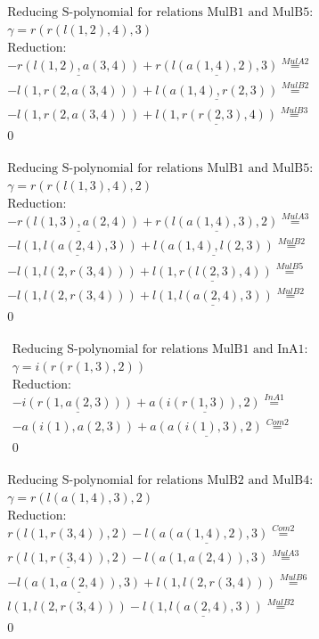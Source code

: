 \documentclass[11pt]{amsart}
\begin{document}
\begin{align*} 
& \text{Reducing S-polynomial for relations MulB1 and MulB5:} \\ 
& \gamma = r(r(l(1,2),4),3) \\ 
& \text{Reduction}: \\& - \underline{r(l(1,2),a(3,4))} + \underline{r(l(a(1,4),2),3)} \stackrel{ MulA2 }{=}  \\ 
& - l(1,r(2,a(3,4))) + \underline{l(a(1,4),r(2,3))} \stackrel{ MulB2 }{=}  \\ 
& - l(1,r(2,a(3,4))) + \underline{l(1,r(r(2,3),4))} \stackrel{ MulB3 }{=}  \\ 
&0\\ 
\end{align*} 
 
\begin{align*} 
& \text{Reducing S-polynomial for relations MulB1 and MulB5:} \\ 
& \gamma = r(r(l(1,3),4),2) \\ 
& \text{Reduction}: \\& - \underline{r(l(1,3),a(2,4))} + \underline{r(l(a(1,4),3),2)} \stackrel{ MulA3 }{=}  \\ 
& - \underline{l(1,l(a(2,4),3))} + \underline{l(a(1,4),l(2,3))} \stackrel{ MulB2 }{=}  \\ 
& - l(1,l(2,r(3,4))) + \underline{l(1,r(l(2,3),4))} \stackrel{ MulB5 }{=}  \\ 
& - l(1,l(2,r(3,4))) + \underline{l(1,l(a(2,4),3))} \stackrel{ MulB2 }{=}  \\ 
&0\\ 
\end{align*} 
 
\begin{align*} 
& \text{Reducing S-polynomial for relations MulB1 and InA1:} \\ 
& \gamma = i(r(r(1,3),2)) \\ 
& \text{Reduction}: \\& - \underline{i(r(1,a(2,3)))} + \underline{a(i(r(1,3)),2)} \stackrel{ InA1 }{=}  \\ 
& - a(i(1),a(2,3)) + \underline{a(a(i(1),3),2)} \stackrel{ Com2 }{=}  \\ 
&0\\ 
\end{align*} 
 
\begin{align*} 
& \text{Reducing S-polynomial for relations MulB2 and MulB4:} \\ 
& \gamma = r(l(a(1,4),3),2) \\ 
& \text{Reduction}: \\&r(l(1,r(3,4)),2) - \underline{l(a(a(1,4),2),3)} \stackrel{ Com2 }{=}  \\ 
&\underline{r(l(1,r(3,4)),2)} - l(a(1,a(2,4)),3) \stackrel{ MulA3 }{=}  \\ 
& - \underline{l(a(1,a(2,4)),3)} + l(1,l(2,r(3,4))) \stackrel{ MulB6 }{=}  \\ 
&l(1,l(2,r(3,4))) - \underline{l(1,l(a(2,4),3))} \stackrel{ MulB2 }{=}  \\ 
&0\\ 
\end{align*} 
 
\end{document}

